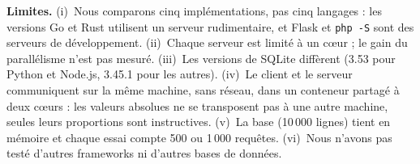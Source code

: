 \textbf{Limites.} (i)~Nous comparons cinq implémentations, pas cinq langages : les versions Go et Rust utilisent
un serveur rudimentaire, et Flask et \texttt{php -S} sont des serveurs de développement. (ii)~Chaque serveur est limité
à un cœur ; le gain du parallélisme n'est pas mesuré. (iii)~Les versions de SQLite diffèrent (3.53 pour Python et
Node.js, 3.45.1 pour les autres). (iv)~Le client et le serveur communiquent sur la même machine, sans réseau, dans un
conteneur partagé à deux cœurs : les valeurs absolues ne se transposent pas à une autre machine, seules leurs
proportions sont instructives. (v)~La base (10\,000 lignes) tient en mémoire et chaque essai compte 500 ou 1\,000
requêtes. (vi)~Nous n'avons pas testé d'autres frameworks ni d'autres bases de données.
